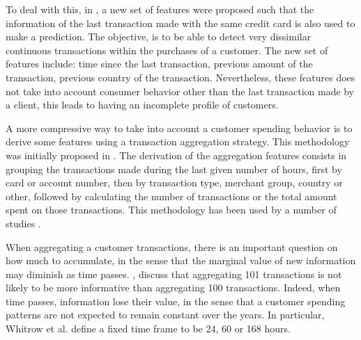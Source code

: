   To deal with this, in \citep{Gadi2008}, a new set of features were proposed such that the 
  information of the last transaction made with the same credit card is also used to make a 
  prediction. The objective, is to be able to detect very dissimilar continuous transactions within 
  the purchases of a customer. The new set of features include: time since the last transaction, 
  previous  amount of the transaction, previous country of the transaction. Nevertheless, these 
  features does not take into account consumer behavior other than the last transaction made by a 
  client, this leads to having an incomplete profile of customers.
	
	A more compressive way to take into account a customer spending behavior is to derive some 
	features using a transaction aggregation strategy. This methodology was initially proposed in 
	\citep{Whitrow2008}.  The derivation of the aggregation features consists in  grouping 
	the transactions made during the last given number of hours, first by card or account number, 
	then by transaction type, merchant group, country or other, followed by calculating the number 
	of transactions or the total amount spent on those 	transactions. This methodology has been used 
	by a number of studies 
	\citep{Bhattacharyya2011,Weston2008,Tasoulis2008,CorreaBahnsen2013,Sahin2013,CorreaBahnsen2014,
DalPozzolo2014}.
	
  When aggregating a customer transactions, there is an important question on how much to 
  accumulate, in the sense that the marginal value of new information may diminish as time passes.
  \cite{Whitrow2008}, discuss that aggregating 101 transactions is not likely to be
  more informative than aggregating 100 transactions. Indeed, when time passes, information lose 
  their value, in the sense that a customer spending patterns are not expected to remain constant 
  over the years. In particular, Whitrow et al. define a fixed time frame to be 24, 60 or 168 
  hours.
  
